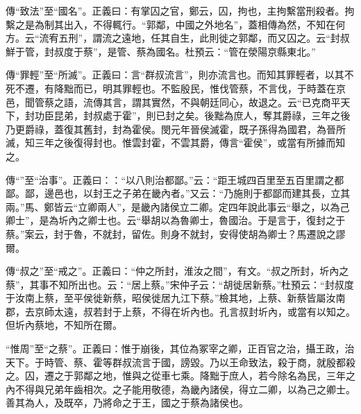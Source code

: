 {\noindent\zhuan{}\fzbyks 傳“致法”至“國名”。正義曰：有掌囚之官，鄭云，囚，拘也，主拘繫當刑殺者。拘繫之是為制其出入，不得輒行。“郭鄰，中國之外地名”，蓋相傳為然，不知在何方。云“流宥五刑”，謂流之遠地，任其自生，此則徙之郭鄰，而又囚之。云“封叔鮮于管，封叔度于蔡”，是管、蔡為國名。杜預云：“管在滎陽京縣東北。” \par}

{\noindent\zhuan{}\fzbyks 傳“罪輕”至“所滅”。正義曰：言“群叔流言”，則亦流言也。而知其罪輕者，以其不死不遷，有降黜而已，明其罪輕也。不監殷民，惟伐管蔡，不言伐，于時蓋在京邑，聞管蔡之語，流傳其言，謂其實然，不與朝廷同心，故退之。云“已克商平天下，封功臣昆弟，封叔處于霍”，則已封之矣。後黜為庶人，奪其爵祿，三年之後乃更爵祿，蓋復其舊封，封為霍侯。閔元年晉侯滅霍，既子孫得為國君，為晉所滅，知三年之後復得封也。惟雲封霍，不雲其爵，傳言“霍侯”，或當有所據而知之。 \par}

{\noindent\zhuan{}\fzbyks 傳“”至“治事”。正義曰：：“以八則治都鄙。”云：“距王城四百里至五百里謂之都鄙。鄙，邊邑也，以封王之子弟在畿內者。”又云：“乃施則于都鄙而建其長，立其兩。”馬、鄭皆云“立卿兩人”，是畿內諸侯立二卿。定四年說此事云“舉之，以為己卿士”，是為圻內之卿士也。云“舉胡以為魯卿士，魯國治。于是言于，復封之于蔡。”案云，封于魯，不就封，留佐。則身不就封，安得使胡為卿士？馬遷說之謬爾。 \par}

{\noindent\zhuan{}\fzbyks 傳“叔之”至“戒之”。正義曰：“仲之所封，淮汝之間”，有文。“叔之所封，圻內之蔡”，其事不知所出也。云：“居上蔡。”宋仲子云：“胡徙居新蔡。”杜預云：“封叔度于汝南上蔡，至平侯徙新蔡，昭侯徙居九江下蔡。”檢其地，上蔡、新蔡皆屬汝南郡，去京師太遠，叔若封于上蔡，不得在圻內也。孔言叔封圻內，或當有以知之。但圻內蔡地，不知所在爾。 \par}

{\noindent\shu{}\fzkt “惟周”至“之蔡”。正義曰：惟于崩後，其位為冢宰之卿，正百官之治，攝王政，治天下。于時管、蔡、霍等群叔流言于國，謗毀。乃以王命致法，殺于商，就殷都殺之。囚，遷之于郭鄰之地，惟與之從車七乘。降黜于庶人，若今除名為民，三年之內不得與兄弟年齒相次。之子能用敬德，為畿內諸侯，得立二卿，以為己之卿士。善其為人，及既卒，乃將命之于王，國之于蔡為諸侯也。 \par}

